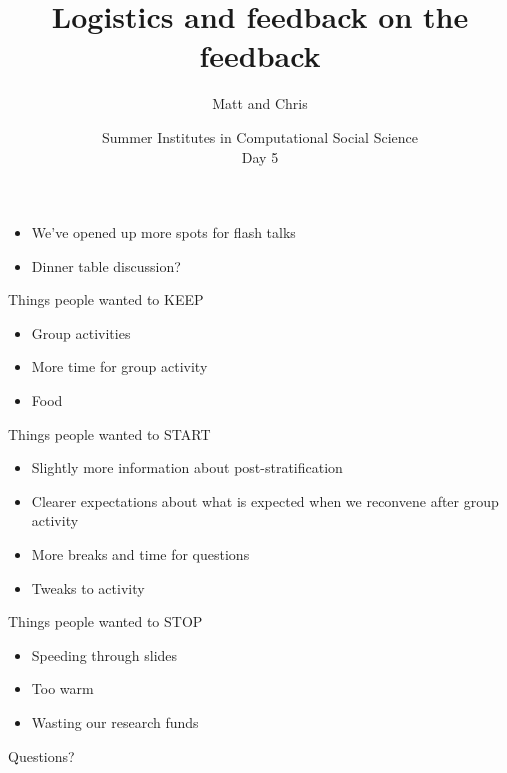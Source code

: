 \documentclass{beamer}
\title[]{Logistics and feedback on the feedback}
\author[]{Matt and Chris}
\date[]{Summer Institutes in Computational Social Science\\Day 5
}
\begin{document}
\frame{\titlepage}
\begin{frame}

\begin{itemize}
\item We've opened up more spots for flash talks
\item Dinner table discussion?
\end{itemize}

\end{frame}
\begin{frame}

Things people wanted to KEEP
\begin{itemize}
\item Group activities
\item More time for group activity
\item Food
\end{itemize}

\end{frame}
\begin{frame}

Things people wanted to START
\begin{itemize}
\item Slightly more information about post-stratification
\pause
\item Clearer expectations about what is expected when we reconvene after group activity
\pause
\item More breaks and time for questions
\pause
\item Tweaks to activity
\end{itemize}

\end{frame}
\begin{frame}

Things people wanted to STOP
\begin{itemize}
\item Speeding through slides
\item Too warm
\item Wasting our research funds
\end{itemize}

\end{frame}
\begin{frame}

\begin{center}
\LARGE
Questions?
\end{center}

\end{frame}
\end{document}
